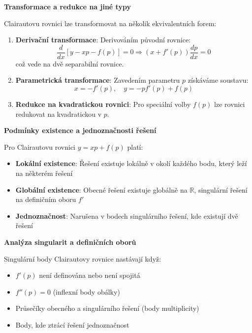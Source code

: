\vspace{1\baselineskip}

\noindent\textbf{Transformace a redukce na jiné typy}

Clairautovu rovnici lze transformovat na několik ekvivalentních forem:

\begin{enumerate}
\item \textbf{Derivační transformace}: Derivováním původní rovnice:
\[
\frac{d}{dx}[y - xp - f(p)] = 0 \Rightarrow (x + f'(p))\frac{dp}{dx} = 0
\]
což vede na dvě separabilní rovnice.

\item \textbf{Parametrická transformace}: Zavedením parametru $p$ získáváme soustavu:
\[
x = -f'(p), \quad y = -pf'(p) + f(p)
\]

\item \textbf{Redukce na kvadratickou rovnici}: Pro speciální volby $f(p)$ lze rovnici redukovat na kvadratickou v $p$.
\end{enumerate}

\vspace{1\baselineskip}

\noindent\textbf{Podmínky existence a jednoznačnosti řešení}

Pro Clairautovu rovnici $y = xp + f(p)$ platí:
\begin{itemize}
\item \textbf{Lokální existence}: Řešení existuje lokálně v okolí každého bodu, který leží na některém řešení
\item \textbf{Globální existence}: Obecné řešení existuje globálně na $\mathbb{R}$, singulární řešení na definičním oboru $f'$
\item \textbf{Jednoznačnost}: Narušena v bodech singulárního řešení, kde existují dvě řešení
\end{itemize}

\vspace{1\baselineskip}

\noindent\textbf{Analýza singularit a definičních oborů}

Singulární body Clairautovy rovnice nastávají když:
\begin{itemize}
\item $f'(p)$ není definována nebo není spojitá
\item $f''(p) = 0$ (inflexní body obálky)
\item Průsečíky obecného a singulárního řešení (body multiplicity)
\item Body, kde ztrácí řešení jednoznačnost
\end{itemize}

